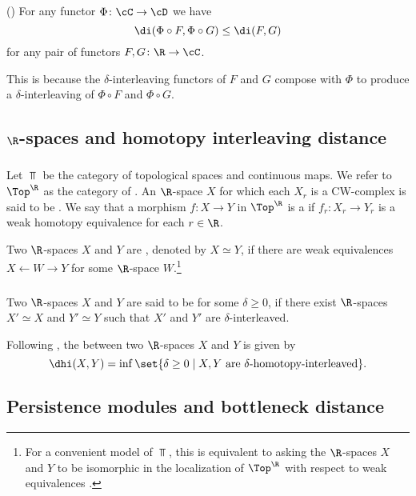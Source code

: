 \proposition (\cite[p.~1508]{bubenik2015metrics})
For any functor $\Phi \colon \cC \to \cD$ we have
\[
\di(\Phi \circ F, \Phi \circ G) \leq \di(F, G)
\]
for any pair of functors $F, G \colon \R \to \cC$.

\medskip\noindent
This is because the $\delta$-interleaving functors of $F$ and $G$ compose with $\Phi$ to produce a $\delta$-interleaving of $\Phi \circ F$ and $\Phi \circ G$.

\subsection{$\R$-spaces and homotopy interleaving distance}

\subsubsection{}\label{ss:R-spaces}

Let $\Top$ be the category of topological spaces and continuous maps.
We refer to $\Top^\R$ as the category of .
An $\R$-space $X$ for which each $X_r$ is a CW-complex is said to be .
We say that a morphism $f \colon X \to Y$ in $\Top^\R$ is a  if $f_r \colon X_r \to Y_r$ is a weak homotopy equivalence for each $r \in \R$.

Two $\R$-spaces $X$ and $Y$ are , denoted by $X \simeq Y$, if there are weak equivalences $X \leftarrow W \rightarrow Y$ for some $\R$-space $W$.\footnote{
For a convenient model of $\Top$, this is equivalent to asking the $\R$-spaces $X$ and $Y$ to be isomorphic in the localization of $\Top^\R$ with respect to weak equivalences \cite{blumberg2023interleaving}.}

\subsubsection{}\label{def:dhi}

Two $\R$-spaces $X$ and $Y$ are said to be  for some $\delta \geq 0$, if there exist $\R$-spaces $X' \simeq X$ and $Y' \simeq Y$ such that $X'$ and $Y'$ are $\delta$-interleaved.

Following \cite{blumberg2023interleaving}, the  between two $\R$-spaces $X$ and $Y$ is given by
\[
\dhi(X,Y) = \inf \set{\delta \geq 0 \mid X,Y \text{ are }\delta\text{-homotopy-interleaved}}.
\]

\subsection{Persistence modules and bottleneck distance}

